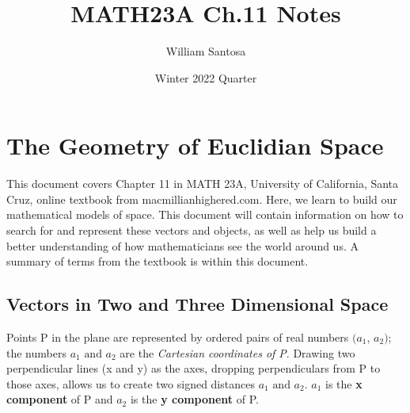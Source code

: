 \documentclass[12pt, letterpaper]{article}
\title{MATH23A Ch.11 Notes}
\author{William Santosa}
\date{Winter 2022 Quarter}
\begin{document}
\maketitle

\section{The Geometry of Euclidian Space}
This document covers Chapter 11 in MATH 23A, University of California, Santa Cruz, online textbook from macmillianhighered.com.
Here, we learn to build our mathematical models of space. This document will contain information on how to search for and represent these vectors and objects, as well as
help us build a better understanding of how mathematicians see the world around us. A summary of terms from the textbook is within this document.

\subsection{Vectors in Two and Three Dimensional Space}
Points P in the plane are represented by ordered pairs of real numbers \((a_{1}\), \( a_{2})\); the numbers \(a_{1}\text{ and }a_{2}\) 
are the \textit{Cartesian coordinates of P}. Drawing two perpendicular lines (x and y) as the axes, dropping perpendiculars from P to those axes,
allows us to create two signed distances \(a_{1}\text{ and }a_{2}\). \(a_{1}\) is the \textbf{x component} of P and \(a_{2}\) is the \textbf{y component} of P.
\end{document}
